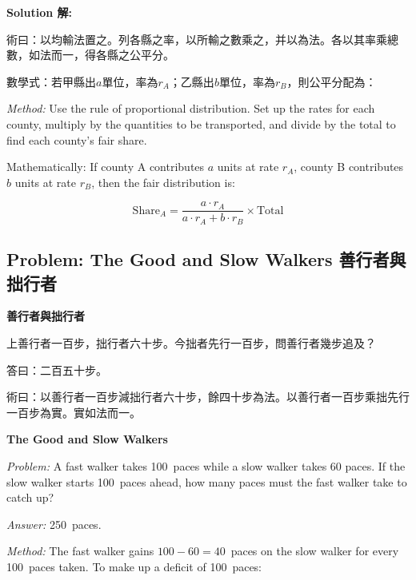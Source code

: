 \documentclass[11pt,a4paper]{article}
\newcommand{\zh}[1]{{\CJKfamily{\CJKrmdefault} #1}}
\newenvironment{chside}{%
  \begin{minipage}[t]{0.48\textwidth}%
  \setlength{\parindent}{1.5em}%
  \linespread{1.25}\selectfont%
  \small%
}{%
  \end{minipage}%
}
\newenvironment{enside}{%
  \hfill\begin{minipage}[t]{0.48\textwidth}%
  \setlength{\parindent}{1em}%
  \linespread{1.15}\selectfont%
  \small%
}{%
  \end{minipage}%
}
\newenvironment{solution}{%
  \par\medskip\noindent\textbf{\textcolor{notecolor}{Solution \zh{解}:}}\par\nopagebreak
  \small\setlength{\parindent}{1em}%
}{%
  \par\medskip%
}
\begin{document}
\medskip

\begin{solution}
\noindent\begin{chside}
\zh{術曰：以均輸法置之。列各縣之率，以所輸之數乘之，并以為法。各以其率乘總數，如法而一，得各縣之公平分。}

數學式：若甲縣出$a$單位，率為$r_A$；乙縣出$b$單位，率為$r_B$，則公平分配為：
\end{chside}%
\begin{enside}
\textit{Method:} Use the rule of proportional distribution. Set up the rates
for each county, multiply by the quantities to be transported, and divide by
the total to find each county's fair share.

Mathematically: If county A contributes $a$ units at rate $r_A$, county B
contributes $b$ units at rate $r_B$, then the fair distribution is:
\end{enside}
\end{solution}

\begin{equation*}
\text{Share}_A = \frac{a \cdot r_A}{a \cdot r_A + b \cdot r_B} \times \text{Total}
\end{equation*}

\subsection{Problem: The Good and Slow Walkers \zh{善行者與拙行者}}

\noindent\begin{chside}
\noindent\textbf{善行者與拙行者}

\zh{上善行者一百步，拙行者六十步。今拙者先行一百步，問善行者幾步追及？}

\medskip
\zh{答曰：二百五十步。}

\medskip
\zh{術曰：以善行者一百步減拙行者六十步，餘四十步為法。以善行者一百步乘拙先行一百步為實。實如法而一。}
\end{chside}%
\begin{enside}
\noindent\textbf{The Good and Slow Walkers}

\textit{Problem:} A fast walker takes 100~paces while a slow walker takes 60
paces. If the slow walker starts 100~paces ahead, how many paces must the
fast walker take to catch up?

\medskip
\textit{Answer:} 250~paces.

\medskip
\textit{Method:} The fast walker gains $100 - 60 = 40$~paces on the slow
walker for every 100~paces taken. To make up a deficit of 100~paces:
\end{enside}
\end{document}
